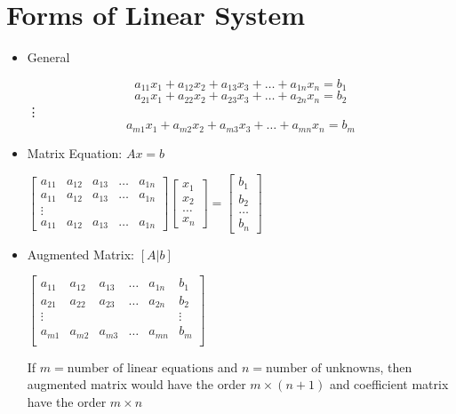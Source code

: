 \documentclass[a4paper,12pt]{article}
\begin{document}
\section*{Forms of Linear System}
\begin{itemize}
  \item General
        \begin{center}
          $$a_{11}x_1+a_{12}x_2+a_{13}x_3+\dots+a_{1n}x_n=b_1$$
          $$a_{21}x_1+a_{22}x_2+a_{23}x_3+\dots+a_{2n}x_n=b_2$$
          \vdots
          $$a_{m1}x_1+a_{m2}x_2+a_{m3}x_3+\dots+a_{mn}x_n=b_m$$
        \end{center}
  \item Matrix Equation: \(Ax=b\)
        \begin{center}
          \(\begin{bmatrix}
            a_{11} & a_{12} & a_{13} & \dots & a_{1n} \\
            a_{11} & a_{12} & a_{13} & \dots & a_{1n} \\
            \vdots                                    \\
            a_{11} & a_{12} & a_{13} & \dots & a_{1n}
          \end{bmatrix} \begin{bmatrix}
            x_1 \\ x_2 \\ \dots \\ x_n
          \end{bmatrix} = \begin{bmatrix}
            b_1 \\ b_2 \\ \dots \\ b_n
          \end{bmatrix}\)
        \end{center}
  \item Augmented Matrix: \([A|b]\)
        \begin{center}
          \(\left[\begin{array}{ccccc|c}
              a_{11} & a_{12} & a_{13} & \dots & a_{1n} & b_1    \\
              a_{21} & a_{22} & a_{23} & \dots & a_{2n} & b_2    \\
              \vdots &        &        &       &        & \vdots \\
              a_{m1} & a_{m2} & a_{m3} & \dots & a_{mn} & b_m    \\
            \end{array}\right] \)
        \end{center}
        If \(m = \text{number of linear equations}\) and \(n = \text{number of unknowns}\), then augmented matrix would have the order \(m\times (n+1)\) and coefficient matrix have the order \(m\times n\)
\end{itemize}
\end{document}
